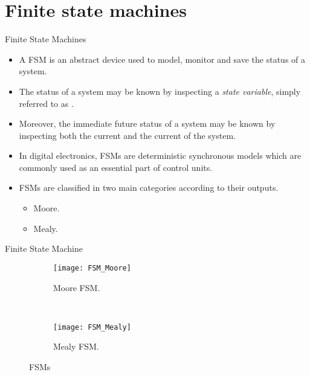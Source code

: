 \section{Finite state machines}
% 
\begin{frame}{Finite State Machines}{}
  \begin{itemize}
    \item A \ac{FSM} is an abstract device used to model, monitor and save the status of a system.
    \item The status of a system may be known by inspecting a \emph{state variable}, simply referred to as .
    \item Moreover, the immediate future status of a system may be known by inspecting both the current  and the current  of the system.
    \item In digital electronics, \acp{FSM} are deterministic synchronous models which are commonly used as an essential part of control units.
    \item \acp{FSM} are classified in two main categories according to their outputs.
    \begin{itemize}
      \item Moore.
      \item Mealy.
    \end{itemize}
  \end{itemize}
\end{frame}

% 
\begin{frame}{Finite State Machine}{}
\begin{figure}
  \centering
  \begin{subfigure}{\textwidth}
    \centering
     \texttt{[image: FSM\_Moore]}
     \caption{Moore \ac{FSM}.}
     \label{Figure:FSM_Moore}
  \end{subfigure}
  \\
  \begin{subfigure}{\textwidth}
    \centering
    \texttt{[image: FSM\_Mealy]}
    \caption{Mealy \ac{FSM}.}
    \label{Figure:FSM_Mealy}
  \end{subfigure}
  \vspace{-12pt}
  \caption{\acp{FSM}}
  \label{Figure:FSMs}
\end{figure}
\end{frame}

